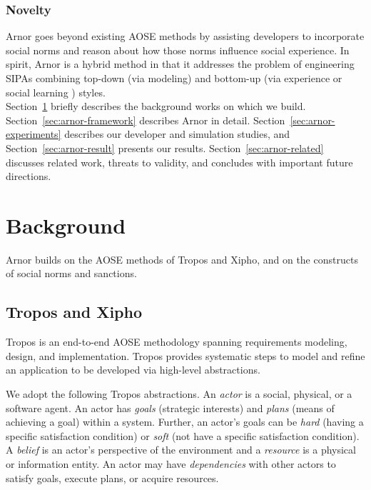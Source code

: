 \documentclass[11pt,          %
               phd,           %
               onehalfspacing %
               ]{ncsuthesis}
\newcommand{\frameworkA}{Arnor\xspace}
\begin{document}
\subsubsection*{Novelty}
\frameworkA goes beyond existing AOSE methods by assisting
developers to incorporate social norms and reason about how those norms
influence social experience. In spirit, \frameworkA is a hybrid method in
that it addresses the problem of engineering SIPAs combining top-down (via
modeling) and bottom-up (via experience or social learning
\citep{Sen-IJCAI07-NormEmergence}) styles.\\

Section~\ref{sec:arnor-preliminaries} briefly describes the background works
on which we build. Section~\ref{sec:arnor-framework} describes \frameworkA in
detail. Section~\ref{sec:arnor-experiments} describes our developer and
simulation studies, and Section~\ref{sec:arnor-result} presents our results.
Section~\ref{sec:arnor-related} discusses related work, threats to validity,
and concludes with important future directions.

\section{Background}
\label{sec:arnor-preliminaries}

\frameworkA builds on the AOSE methods of Tropos and Xipho, and on the 
constructs of social norms and sanctions.

\subsection{Tropos and Xipho}
\label{subsec:background}

Tropos \citep{Bresciani-JAAMAS04-Tropos} is an end-to-end AOSE
methodology spanning requirements modeling, design, and implementation.
Tropos provides systematic steps to model and refine an application to
be developed via high-level abstractions.

We adopt the following Tropos abstractions. An \emph{actor} is a social,
physical, or a software agent. An actor has \emph{goals} (strategic
interests) and \emph{plans} (means of achieving a goal) within a
system. Further, an actor's goals can be \emph{hard} (having a specific
satisfaction condition) or \emph{soft} (not have a specific satisfaction 
condition). A \emph{belief} is an actor's perspective of the environment and a
\emph{resource} is a physical or information entity. An actor may have
\emph{dependencies} with other actors to satisfy goals, execute plans,
or acquire resources.
\end{document}
